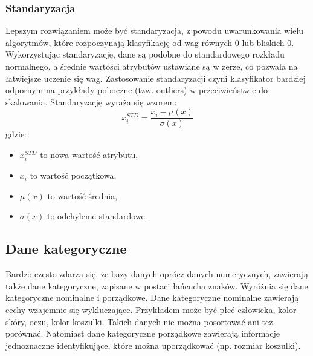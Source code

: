 \subsubsection{Standaryzacja}
Lepszym rozwiązaniem może być standaryzacja, z powodu uwarunkowania wielu algorytmów, które rozpoczynają klasyfikację od wag równych 0 lub bliskich 0. Wykorzystując standaryzację, dane są podobne do standardowego rozkładu normalnego, a średnie wartości atrybutów ustawiane są w zerze, co pozwala na łatwiejsze uczenie się wag. Zastosowanie standaryzacji czyni klasyfikator bardziej odpornym na przykłady poboczne (tzw. outliers) w przeciwieństwie do skalowania. Standaryzację wyraża się wzorem:
\[x_i^{STD} = \frac{x_i - \mu(x)}{\sigma(x)}\]
gdzie:
\begin{itemize}
	\item $x_i^{STD}$ to nowa wartość atrybutu,
	\item $x_i$ to wartość początkowa,
	\item $\mu(x)$ to wartość średnia,
	\item $\sigma(x)$ to odchylenie standardowe.
\end{itemize}
\subsection{Dane kategoryczne}
Bardzo często zdarza się, że bazy danych oprócz danych numerycznych, zawierają także dane kategoryczne, zapisane w postaci łańcucha znaków. Wyróżnia się dane kategoryczne nominalne i porządkowe. Dane kategoryczne nominalne zawierają cechy wzajemnie się wykluczające. Przykładem może być płeć człowieka, kolor skóry, oczu, kolor koszulki. Takich danych nie można posortować ani też porównać. Natomiast dane kategoryczne porządkowe zawierają informacje jednoznaczne identyfikujące, które można uporządkować (np. rozmiar koszulki).
